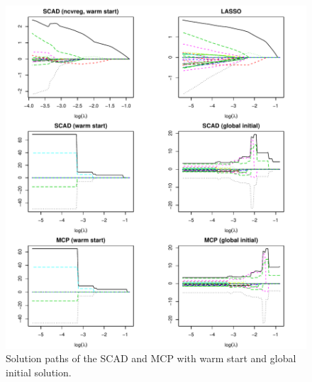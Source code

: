 
\begin{figure}[htbp]
  \centering
  \includegraphics[width=\linewidth]{initial-eff}
  \caption{Solution paths of the SCAD and MCP with warm start and global initial solution.}
  \label{fig:ini}
\end{figure}

